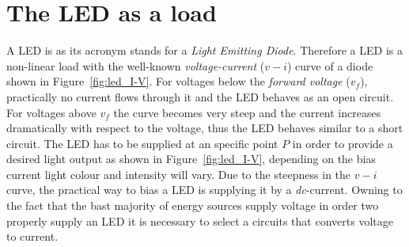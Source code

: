 \section{The LED as a load}
\label{sc:LED_load}
A LED is as its acronym stands for a \emph{Light Emitting Diode}. Therefore a LED is a non-linear load with the well-known \emph{voltage-current} ($v-i$) curve of a diode shown in Figure~\ref{fig:led_I-V}. For voltages below the \emph{forward voltage} ($v_{f}$), practically no current flows through it and the LED behaves as an open circuit. For voltages above $v_{f}$ the curve becomes very steep and the current increases dramatically with respect to the voltage, thus the LED behaves similar to a short circuit. The LED has to be supplied at an specific point $P$ in order to provide a desired light output as shown in Figure~\ref{fig:led_I-V}, depending on the bias current light colour and intensity will vary. Due to the steepness in the $v-i$ curve, the practical way to bias a LED is supplying it by a \emph{dc}-current. Owning to the fact that the bast majority of energy sources supply voltage in order two properly supply an LED  it is necessary to select a circuits that converts voltage to current.

